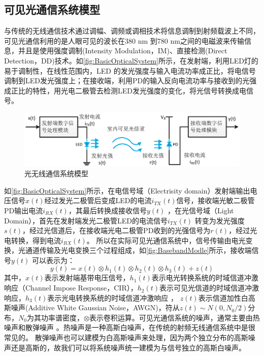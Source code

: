 \subsection{可见光通信系统模型}
与传统的无线通信技术通过调幅、调频或调相技术将信息调制到射频载波上不同，可见光通信利用的是人眼可见的波长在380 nm 到780 nm之间的电磁波来传输信息，并且是使用强度调制(Intensity Modulation，IM)、直接检测(Direct Detection，DD)技术。如\autoref{fig:BasicOpticalSystem}所示，在发射端，利用LED灯的易于调制性，在线性范围内，LED 的发光强度与输入电流功率成正比，将电信号调制到LED发光强度上；在接收端，利用PD的输入反向电流功率与接收到的光强成正比的特性，用光电二极管去检测LED发光强度的变化，将光信号转换成电信号。
\begin{figure}[htbp]
    \centering
    \includegraphics[width=\textwidth]{figures/chapter-2/BasicOpticalSystem.eps}
    \caption{光无线通信系统模型}
    \label{fig:BasicOpticalSystem}
\end{figure}
如\autoref{fig:BasicOpticalSystem}所示，在电信号域（Electrisity domain）发射端输出电压信号$x(t)$经过发光二极管后变成LED的电流$i_{TX}(t)$信号，接收端光敏二极管PD输出电流$i_{RX}(t)$，其最后转换成接收信号$y(t)$ ，在光信号域（Light Domain），首先在发射端发光二极管LED的电流信号$i_{TX}(t)$ 转变为发光强度$s(t)$，经过光信道后，在接收端光电二极管PD收到的光强信号为$r(t)$，经过光电转换，得到电流$i_{RX}(t)$。
所以在实际可见光通信系统中，信号传输由电光变换，光通道传输及光电变换三个过程组成，如\autoref{fig:BasebandModle}所示，接收端信号$y(t)$ 可以表示为：
\begin{equation}
    y(t)=x(t)\otimes h_1(t)\otimes h_2(t)\otimes h_3(t)+z(t)
\end{equation}
其中，$x(t)$表示发射端基带电压信号，$h_1(t)$表示电光转换系统的时域信道冲激响应（Channel Impose Response，CIR），$h_2(t)$表示可见光信道的时域信道冲激响应，$h_3(t)$表示光电转换系统的时域信道冲激响应
\cite{Yangxuecheng2015}，
$z(t)$表示信道加性白高斯噪声(Additive White Gaussian Noise，AWGN)，符从$z(t)\sim N(0,N_0/2)$分布，$N_0$为其功率谱密度，$\otimes$表示卷积运算。可见光通信系统的噪声，通常主要由热噪声和散弹噪声
\cite{Chenchunyan2014}。热噪声是一种高斯白噪声，在传统的射频无线通信系统中是很常见的。
散弹噪声也可以建模为白高斯噪声来处理，因为两个独立分布的高斯噪声还是高斯的，故我们可以将系统噪声统一建模为与信号独立的高斯白噪声。

